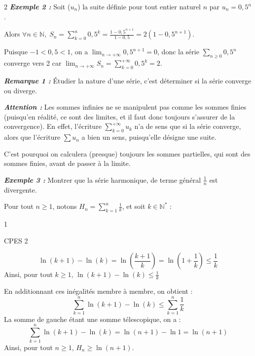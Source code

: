 \documentclass[10pt,a4paper]{article}
\begin{document}
\begin{multicols}{2}
\textbf{\textit{Exemple 2 :}} Soit ($u_n$) la suite définie pour tout entier naturel $n$ par $u_n = 0,5^n$.

Alors $\forall n \in \mathbb{N},\; S_n = \sum_{k=0}^n 0,5^k = \frac{1-0,5^{n+1}}{1-0,5} = 2(1 - 0,5^{n+1})$.

Puisque $-1 < 0,5 < 1$, on a $\lim_{n \to +\infty} 0,5^{n+1} = 0$, donc la série $\sum_{n \ge 0} 0,5^n$ converge vers 2 car $\lim_{n \to +\infty} S_n = \sum_{k=0}^{+\infty} 0,5^k = 2$.

\textbf{\textit{Remarque 1 :}} Étudier la nature d'une série, c'est déterminer si la série converge ou diverge.

\textbf{\textit{Attention :}} Les sommes infinies ne se manipulent pas comme les sommes finies (puisqu'en réalité, ce sont des limites, et il faut donc toujours s'assurer de la convergence). En effet, l'écriture $\sum_{k=0}^{+\infty} u_k$ n'a de sens que si la série converge, alors que l'écriture $\sum u_n$ a bien un sens, puisqu'elle désigne une suite.

C'est pourquoi on calculera (presque) toujours les sommes partielles, qui sont des sommes finies, avant de passer à la limite.

\textbf{\textit{Exemple 3 :}} Montrer que la série harmonique, de terme général $\frac{1}{n}$ est divergente.

Pour tout $n \ge 1$, notons $H_n = \sum_{k=1}^n \frac{1}{k}$, et soit $k \in \mathbb{N}^*$ :

\vfill
\centerline{\footnotesize 1}

\newpage

\begin{flushright}
\footnotesize CPES 2
\end{flushright}
\vspace{-0.2cm}

\begin{equation*}
\ln(k+1) - \ln(k) = \ln\left(\frac{k+1}{k}\right) = \ln\left(1 + \frac{1}{k}\right) \le \frac{1}{k}
\end{equation*}
Ainsi, pour tout $k \ge 1$, $\ln(k+1) - \ln(k) \le \frac{1}{k}$

En additionnant ces inégalités membre à membre, on obtient :
\begin{equation*}
\sum_{k=1}^n \ln(k+1) - \ln(k) \le \sum_{k=1}^n \frac{1}{k}
\end{equation*}
La somme de gauche étant une somme télescopique, on a :
\begin{equation*}
\sum_{k=1}^n \ln(k+1) - \ln(k) = \ln(n+1) - \ln 1 = \ln(n+1)
\end{equation*}
Ainsi, pour tout $n \ge 1$, $H_n \ge \ln(n+1)$.


\end{multicols}
\end{document}
